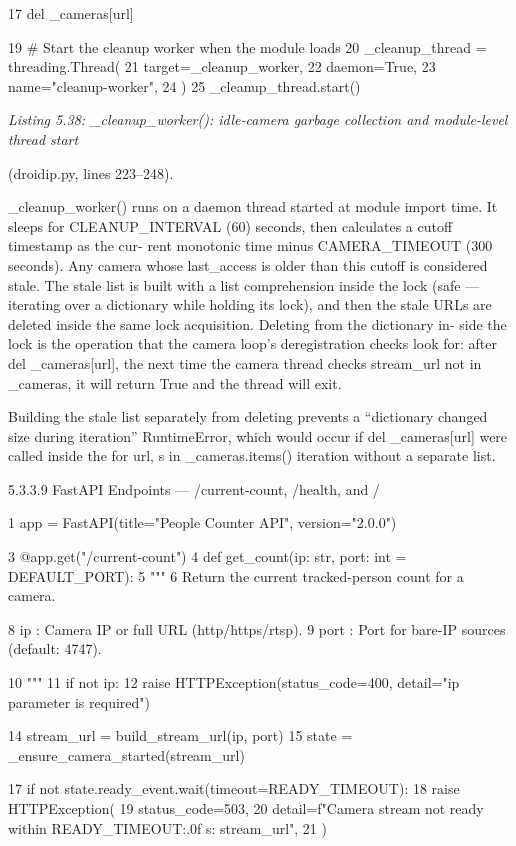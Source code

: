 17 del \_cameras[url]

19 \# Start the cleanup worker when the module loads
20 \_cleanup\_thread = threading.Thread(
21 target=\_cleanup\_worker,
22 daemon=True,
23 name="cleanup-worker",
24 )
25 \_cleanup\_thread.start()


\textit{Listing 5.38: \_cleanup\_worker(): idle-camera garbage collection and module-level thread start}

(droidip.py, lines 223--248).


\_cleanup\_worker() runs on a daemon thread started at module import time. It
sleeps for CLEANUP\_INTERVAL (60) seconds, then calculates a cutoff timestamp as the cur-
rent monotonic time minus CAMERA\_TIMEOUT (300 seconds). Any camera whose last\_access
is older than this cutoff is considered stale. The stale list is built with a list comprehension
inside the lock (safe --- iterating over a dictionary while holding its lock), and then the
stale URLs are deleted inside the same lock acquisition. Deleting from the dictionary in-
side the lock is the operation that the camera loop's deregistration checks look for: after del
\_cameras[url], the next time the camera thread checks stream\_url not in \_cameras,
it will return True and the thread will exit.

Building the stale list separately from deleting prevents a ``dictionary changed size
during iteration'' RuntimeError, which would occur if del \_cameras[url] were called
inside the for url, s in \_cameras.items() iteration without a separate list.


5.3.3.9 FastAPI Endpoints --- /current-count, /health, and /

1 app = FastAPI(title="People Counter API", version="2.0.0")

3 @app.get("/current-count")
4 def get\_count(ip: str, port: int = DEFAULT\_PORT):
5 """
6 Return the current tracked-person count for a camera.


8 ip : Camera IP or full URL (http/https/rtsp).
9 port : Port for bare-IP sources (default: 4747).




10 """
11 if not ip:
12 raise HTTPException(status\_code=400, detail="ip parameter is required")

14 stream\_url = build\_stream\_url(ip, port)
15 state = \_ensure\_camera\_started(stream\_url)


17 if not state.ready\_event.wait(timeout=READY\_TIMEOUT):
18 raise HTTPException(
19 status\_code=503,
20 detail=f"Camera stream not ready within {READY\_TIMEOUT:.0f} s: {
stream\_url}",
21 )

